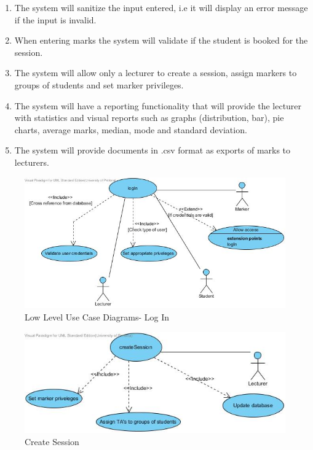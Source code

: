\documentclass[a4paper]{article}
\begin{document}
\begin{enumerate}
		\item The system will sanitize the input entered, i.e it will display an error message if the input is invalid.
		\item When entering marks the system will validate if the student is booked for the session.
		\item The system will allow only a lecturer to create a session, assign markers to groups of students and set marker privileges.
		\item The system will have a reporting functionality that will provide the lecturer with statistics and visual reports such as graphs (distribution, bar), pie charts, average marks, median, mode and standard deviation. 
		\item The system will provide documents in .csv format as exports of marks to lecturers.
		
		\end{enumerate}
			\begin{figure}[H]
				\centering
				\includegraphics[width=1\textwidth]{logIn}
				\caption{Low Level Use Case Diagrams- Log In}
			\end{figure}
			\begin{figure}[H]
				\centering
				\includegraphics[width=1\textwidth]{createSession}
				\caption{Create Session}
			\end{figure}
\end{document}
